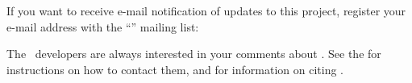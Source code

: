 

{\samepage
If you want to receive e-mail
notification of updates to this project, register
your e-mail address with the ``\mumag'' mailing list:
\begin{center}
\end{center}
} %

The \OOMMF\ developers are always interested in your comments about
\OOMMF.  See the
for instructions on how to contact them, and for information on
citing \OOMMF.
